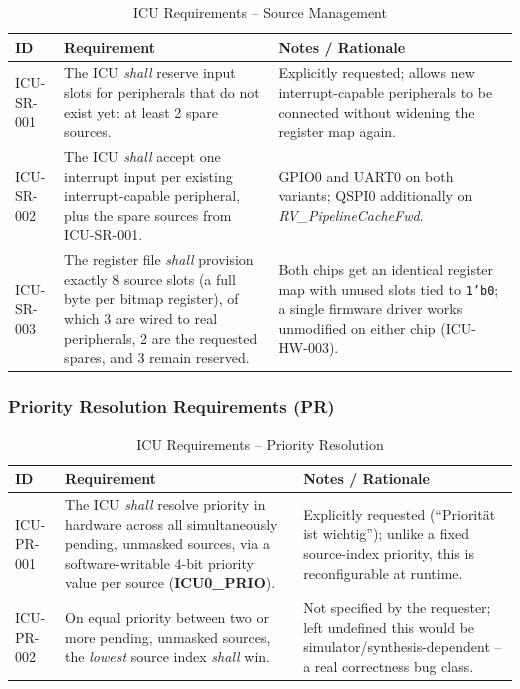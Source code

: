 \begin{table}[H]
\caption{ICU Requirements -- Source Management}
\label{tab:asIcuReqSR}
\centering
\begin{tabularx}{\textwidth}{|l |X |X|}
  \hline
  ID & Requirement & Notes / Rationale \\
  \hline
  \hline
  ICU-SR-001 &
    The ICU \textit{shall} reserve input slots for peripherals that do not
    exist yet: at least 2 spare sources. &
    Explicitly requested; allows new interrupt-capable peripherals to be
    connected without widening the register map again. \\
  \hline
  ICU-SR-002 &
    The ICU \textit{shall} accept one interrupt input per existing
    interrupt-capable peripheral, plus the spare sources from ICU-SR-001. &
    GPIO0 and UART0 on both variants; QSPI0 additionally on
    \textit{RV\_PipelineCacheFwd}. \\
  \hline
  ICU-SR-003 &
    The register file \textit{shall} provision exactly 8 source slots
    (a full byte per bitmap register), of which 3 are wired to real
    peripherals, 2 are the requested spares, and 3 remain reserved. &
    Both chips get an identical register map with unused slots tied to
    \texttt{1'b0}; a single firmware driver works unmodified on either
    chip (ICU-HW-003). \\
  \hline
\end{tabularx}
\end{table}

\subsubsection{Priority Resolution Requirements (PR)}

\begin{table}[H]
\caption{ICU Requirements -- Priority Resolution}
\label{tab:asIcuReqPR}
\centering
\begin{tabularx}{\textwidth}{|l |X |X|}
  \hline
  ID & Requirement & Notes / Rationale \\
  \hline
  \hline
  ICU-PR-001 &
    The ICU \textit{shall} resolve priority in hardware across all
    simultaneously pending, unmasked sources, via a software-writable
    4-bit priority value per source (\textbf{ICU0\_PRIO}). &
    Explicitly requested (``Priorit\"at ist wichtig''); unlike a fixed
    source-index priority, this is reconfigurable at runtime. \\
  \hline
  ICU-PR-002 &
    On equal priority between two or more pending, unmasked sources, the
    \textit{lowest} source index \textit{shall} win. &
    Not specified by the requester; left undefined this would be
    simulator/synthesis-dependent -- a real correctness bug class. \\
  \hline
\end{tabularx}
\end{table}

